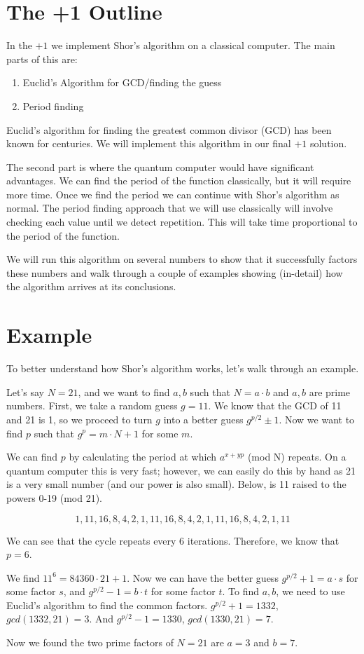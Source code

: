 \documentclass[a4paper]{article}
\begin{document}
\section{The +1 Outline}
In the $+1$ we implement Shor's algorithm on a classical computer. The main parts of this are:
\begin{enumerate}
\item Euclid's Algorithm for GCD/finding the guess
\item Period finding
\end{enumerate}

Euclid's algorithm for finding the greatest common divisor (GCD) has been known for centuries.
We will implement this algorithm in our final $+1$ solution.

The second part is where the quantum computer would have significant advantages. We can find the period of the function classically,
but it will require more time. Once we find the period we can continue with Shor's algorithm as normal.
The period finding approach that we will use classically will involve checking each value until we detect repetition.
This will take time proportional to the period of the function.

We will run this algorithm on several numbers to show that it successfully factors these numbers and walk through a couple of examples showing (in-detail) how the algorithm arrives at its conclusions.

\section{Example}
To better understand how Shor's algorithm works, let's walk through an example.

Let's say $N=21$, and we want to find $a, b$ such that $N = a \cdot b$ and $a, b$ are prime numbers.
First, we take a random guess $g=11$. We know that the GCD of 11 and 21 is 1, so we proceed to turn $g$ into a better guess $g^{p/2} \pm 1$.
Now we want to find $p$ such that $g^p = m \cdot N + 1$ for some $m$.

We can find $p$ by calculating the period at which $a ^{x+ yp}$ (mod N) repeats. On a quantum computer this is very fast;
however, we can easily do this by hand as 21 is a very small number (and our power is also small).
Below, is 11 raised to the powers 0-19 (mod 21).

$$1, 11, 16, 8, 4, 2, 1, 11, 16, 8, 4, 2, 1, 11, 16, 8, 4, 2, 1, 11$$

We can see that the cycle repeats every 6 iterations. Therefore, we know that $p = 6$.

We find $11^ 6 = 84360 \cdot 21 + 1$. Now we can have the better guess $g^{p/2} + 1 = a \cdot s$ for some factor $s$,
and $g^{p/2} - 1 = b \cdot t$ for some factor $t$. To find $a,b$, we need to use Euclid's algorithm to find the common factors.
$g^{p/2} + 1 = 1332$, $gcd(1332, 21) = 3$. And $g^{p/2} - 1 = 1330$, $gcd(1330, 21) = 7$.

Now we found the two prime factors of $N=21$ are $a = 3$ and $b = 7$.

\newpage


\end{document}
